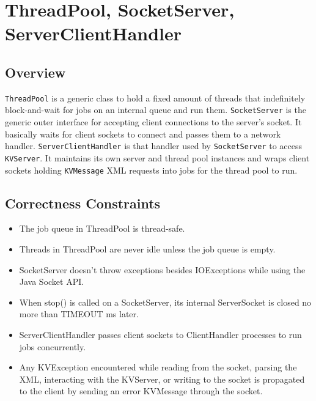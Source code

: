 \section{ThreadPool, SocketServer, ServerClientHandler}
\subsection{Overview}
\texttt{ThreadPool} is a generic class to hold a fixed amount of threads that indefinitely block-and-wait for jobs on an internal queue and run them. \texttt{SocketServer} is the generic outer interface for accepting client connections to the server's socket. It basically waits for client sockets to connect and passes them to a network handler. \texttt{ServerClientHandler} is that handler used by \texttt{SocketServer} to access \texttt{KVServer}. It maintains its own server and thread pool instances and wraps client sockets holding \texttt{KVMessage} XML requests into jobs for the thread pool to run.
\subsection{Correctness Constraints}
\begin{itemize}
\item The job queue in ThreadPool is thread-safe.
\item Threads in ThreadPool are never idle unless the job queue is empty.
\item SocketServer doesn't throw exceptions besides IOExceptions while using the Java Socket API.
\item When stop() is called on a SocketServer, its internal ServerSocket is closed no more than TIMEOUT ms later.
\item ServerClientHandler passes client sockets to ClientHandler processes to run jobs concurrently.
\item Any KVException encountered while reading from the socket, parsing the XML, interacting with the KVServer, or writing to the socket is propagated to the client by sending an error KVMessage through the socket.
\end{itemize}
